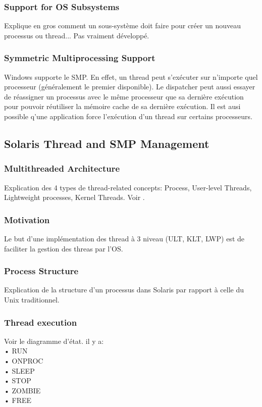 \subsubsection{Support for OS Subsystems}
Explique en gros comment un sous-système doit faire pour créer un nouveau processus ou thread... Pas vraiment développé.
\subsubsection{Symmetric Multiprocessing Support}
Windows supporte le SMP. En effet, un thread peut s'exécuter sur n'importe quel processeur (généralement le premier disponible). Le dispatcher peut aussi essayer de réassigner un processus avec le même processeur que sa dernière exécution pour pouvoir réutiliser la mémoire cache de sa dernière exécution. Il est ausi possible q'une application force l'exécution d'un thread sur certains processeurs.
\subsection{Solaris Thread and SMP Management }
\subsubsection{Multithreaded Architecture}
Explication des 4 types de thread-related concepts: Process, User-level Threads, Lightweight processes, Kernel Threads. Voir \cite[p.~202]{stallings}.
\subsubsection{Motivation}
Le but d'une implémentation des thread à 3 niveau (ULT, KLT, LWP) est de faciliter la gestion des threas par l'OS.
\subsubsection{Process Structure}
Explication de la structure d'un processus dans Solaris par rapport à celle du Unix traditionnel.
\subsubsection{Thread execution}
Voir le diagramme d'état. il y a:  \\
• RUN \\
• ONPROC  \\
• SLEEP \\
• STOP \\
• ZOMBIE \\
• FREE\\
